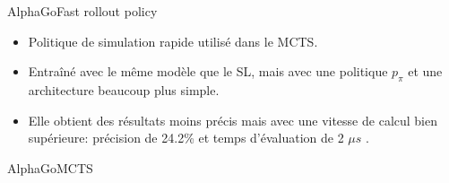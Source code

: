 \begin{frame}{AlphaGo}{Fast rollout policy}
	\begin{itemize}
		\item Politique de simulation rapide utilisé dans le MCTS.
		\item Entraîné avec le même modèle que le SL, mais avec une politique $p_\pi$ et une architecture beaucoup plus simple.
		\item Elle obtient des résultats moins précis mais avec une vitesse de calcul bien supérieure: précision de 24.2\% et temps d'évaluation de 2 $\mu s$ .
	\end{itemize}
\end{frame}


\begin{frame}{AlphaGo}{MCTS}

\end{frame}
